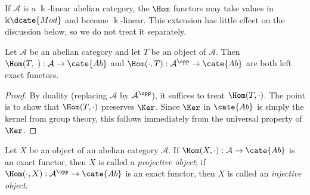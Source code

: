 If $\mathcal{A}$ is a $\Bbbk$-linear abelian category, the $\Hom$ functors may
take values in $\Bbbk\dcate{Mod}$ and become $\Bbbk$-linear. This extension
has little effect on the discussion below, so we do not treat it separately.

\begin{proposition}\label{prop:Hom-left-exact}
Let $\mathcal{A}$ be an abelian category and let $T$ be an object of
$\mathcal{A}$. Then $\Hom(T,\cdot):\mathcal{A}\to\cate{Ab}$ and
$\Hom(\cdot,T):\mathcal{A}^{\opp}\to\cate{Ab}$ are both left exact functors.
\end{proposition}

\begin{proof}
By duality (replacing $\mathcal{A}$ by $\mathcal{A}^{\opp}$), it suffices to
treat $\Hom(T,\cdot)$. The point is to show that $\Hom(T,\cdot)$ preserves
$\Ker$. Since $\Ker$ in $\cate{Ab}$ is simply the kernel from group theory,
this follows immediately from the universal property of $\Ker$.
\end{proof}

\begin{definition}\label{def:injective-projective-obj}
Let $X$ be an object of an abelian category $\mathcal{A}$. If
$\Hom(X,\cdot):\mathcal{A}\to\cate{Ab}$ is an exact functor, then $X$ is
called a \emph{projective object}; if
$\Hom(\cdot,X):\mathcal{A}^{\opp}\to\cate{Ab}$ is an exact functor, then $X$
is called an \emph{injective object}.
\end{definition}

